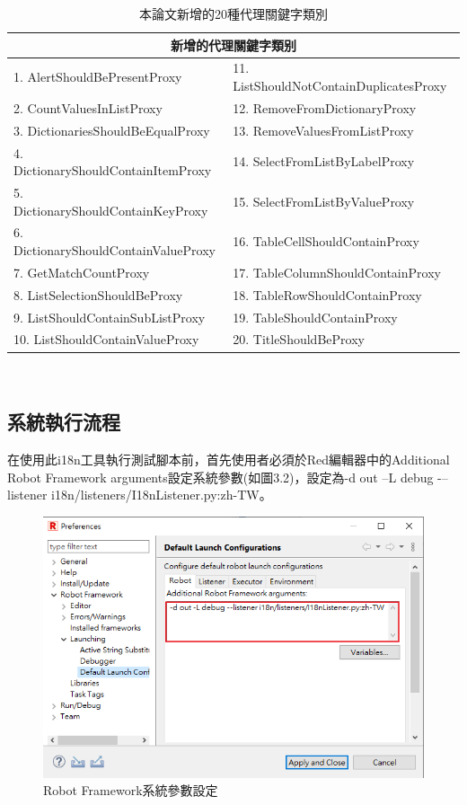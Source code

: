 \begin{table}[H]
    \centering
        \begin{tabular}{|l|l|}
        \hline
        \multicolumn{2}{|c|}{新增的代理關鍵字類别} \\ \hline
        1. AlertShouldBePresentProxy & 11. ListShouldNotContainDuplicatesProxy\\ 
        2. CountValuesInListProxy & 12. RemoveFromDictionaryProxy\\ 
        3. DictionariesShouldBeEqualProxy & 13. RemoveValuesFromListProxy\\
        4. DictionaryShouldContainItemProxy & 14. SelectFromListByLabelProxy\\
        5. DictionaryShouldContainKeyProxy & 15. SelectFromListByValueProxy\\
        6. DictionaryShouldContainValueProxy & 16. TableCellShouldContainProxy\\
        7. GetMatchCountProxy & 17. TableColumnShouldContainProxy\\
        8. ListSelectionShouldBeProxy & 18. TableRowShouldContainProxy\\
        9. ListShouldContainSubListProxy & 19. TableShouldContainProxy\\
        10. ListShouldContainValueProxy & 20. TitleShouldBeProxy\\   
        \hline
        \end{tabular}
    \caption{本論文新增的20種代理關鍵字類別}
\end{table}

\hspace*{\fill} \\
\subsection{系統執行流程}
在使用此i18n工具執行測試腳本前，首先使用者必須於Red編輯器\cite{red}中的Additional Robot Framework arguments設定系統參數(如圖3.2)，設定為-d out –L debug -–listener i18n/listeners/I18nListener.py:zh-TW。

\begin{figure}[H]
\includegraphics[width= 1.1\textwidth]{../論文截圖/3-1-3-1 設定系統參數.png}
\caption{Robot Framework系統參數設定}
\end{figure}


